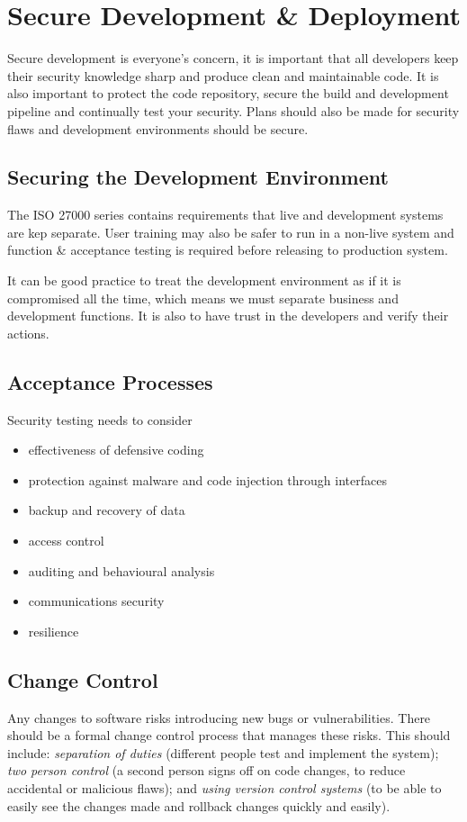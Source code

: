 \section*{Secure Development \& Deployment}
Secure development is everyone's concern, it is important that all developers keep their security knowledge sharp and produce clean and maintainable code. It is also important to protect the code repository, secure the build and development pipeline and continually test your security. Plans should also be made for security flaws and development environments should be secure. 
\subsection*{Securing the Development Environment}
The ISO 27000 series contains requirements that live and development systems are kep separate. User training may also be safer to run in a non-live system and function \& acceptance testing is required before releasing to production system.

It can be good practice to treat the development environment as if it is compromised all the time, which means we must separate business and development functions. It is also to have trust in the developers and verify their actions.

\subsection*{Acceptance Processes}
Security testing needs to consider
\begin{itemize}
    \item effectiveness of defensive coding
    \item protection against malware and code injection through interfaces
    \item backup and recovery of data
    \item access control
    \item auditing and behavioural analysis
    \item communications security
    \item resilience
\end{itemize}

\subsection*{Change Control}
Any changes to software risks introducing new bugs or vulnerabilities. There should be a formal change control process that manages these risks. This should include: \textit{separation of duties} (different people test and implement the system); \textit{two person control} (a second person signs off on code changes, to reduce accidental or malicious flaws); and \textit{using version control systems} (to be able to easily see the changes made and rollback changes quickly and easily). 

